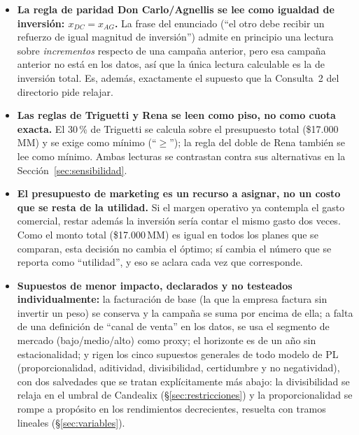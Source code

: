 \documentclass[10pt,a4paper]{article}
\begin{document}
\begin{itemize}
  \item[\textbf{S6}] \textbf{La regla de paridad Don Carlo/Agnellis se lee como
    igualdad de inversión: $x_{DC}=x_{AG}$.} La frase del enunciado (``el otro
    debe recibir un refuerzo de igual magnitud de inversión'') admite en
    principio una lectura sobre \emph{incrementos} respecto de una campaña
    anterior, pero esa campaña anterior no está en los datos, así que la única
    lectura calculable es la de inversión total. Es, además, exactamente el
    supuesto que la Consulta~2 del directorio pide relajar.

  \item[\textbf{S7}] \textbf{Las reglas de Triguetti y Rena se leen como
    piso, no como cuota exacta.} El 30\,\% de Triguetti se calcula sobre el
    presupuesto total (\$17.000\,MM) y se exige como mínimo (``$\geq$''); la
    regla del doble de Rena también se lee como mínimo. Ambas lecturas se
    contrastan contra sus alternativas en la Sección~\ref{sec:sensibilidad}.

  \item[\textbf{S8}] \textbf{El presupuesto de marketing es un recurso a
    asignar, no un costo que se resta de la utilidad.} Si el margen operativo
    ya contempla el gasto comercial, restar además la inversión sería contar
    el mismo gasto dos veces. Como el monto total (\$17.000\,MM) es igual en
    todos los planes que se comparan, esta decisión no cambia el óptimo; sí
    cambia el número que se reporta como ``utilidad'', y eso se aclara cada vez
    que corresponde.

  \item[\textbf{S9}] \textbf{Supuestos de menor impacto, declarados y no
    testeados individualmente:} la facturación de base (la que la empresa
    factura sin invertir un peso) se conserva y la campaña se suma por
    encima de ella; a falta de una definición de ``canal de venta'' en los
    datos, se usa el segmento de mercado (bajo/medio/alto) como proxy; el
    horizonte es de un año sin estacionalidad; y rigen los cinco supuestos
    generales de todo modelo de PL (proporcionalidad, aditividad,
    divisibilidad, certidumbre y no negatividad), con dos salvedades que se
    tratan explícitamente más abajo: la divisibilidad se relaja en el umbral
    de Candealix (\S\ref{sec:restricciones}) y la proporcionalidad se rompe a
    propósito en los rendimientos decrecientes, resuelta con tramos lineales
    (\S\ref{sec:variables}).
\end{itemize}
\end{document}

